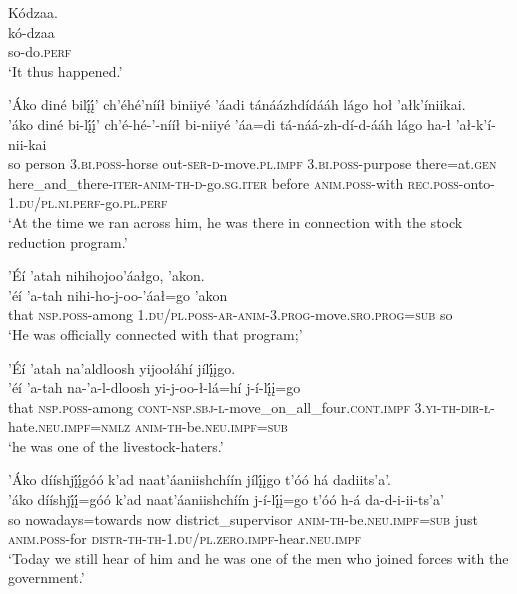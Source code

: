 \ea\label{ex:text7-10-5}
Kódzaa.\\
\gll kó-dzaa\\
     so-do.\textsc{perf}\\
\glt `It thus happened.'
\z

\ea\label{ex:text7-10-6}
’Áko diné bilį́į́’ ch’éhé’nííł biniiyé ’áadi tánáázhdídááh lágo hoł ’ałk’íniikai.\\
\gll ’áko	diné	bi-lį́į́’	ch’é-hé-’-nííł	bi-niiyé	’áa=di	tá-náá-zh-dí-d-ááh	lágo	ha-ł	’ał-k’í-nii-kai\\
     so	person	3.\textsc{bi}.\textsc{poss}-horse	out-\textsc{ser}-\textsc{d}-move.\textsc{pl}.\textsc{impf}	3.\textsc{bi}.\textsc{poss}-purpose	there=at.\textsc{gen}	here\_and\_there-\textsc{iter}-\textsc{anim}-\textsc{th}-\textsc{d}-go.\textsc{sg}.\textsc{iter}	before	\textsc{anim}.\textsc{poss}-with	\textsc{rec}.\textsc{poss}-onto-1.\textsc{du}/\textsc{pl}.\textsc{ni}.\textsc{perf}-go.\textsc{pl}.\textsc{perf}\\
\glt `At the time we ran across him, he was there in connection with the stock reduction program.'
\z

\ea\label{ex:text7-10-7}
’Éí ’atah nihihojoo’áałgo, ’akon.\\
\gll ’éí	’a-tah	nihi-ho-j-oo-’áał=go	’akon\\
     that	\textsc{nsp}.\textsc{poss}-among	1.\textsc{du}/\textsc{pl}.\textsc{poss}-\textsc{ar}-\textsc{anim}-3.\textsc{prog}-move.\textsc{sro}.\textsc{prog}=\textsc{sub}	so\\
\glt `He was officially connected with that program;'
\z

\ea\label{ex:text7-10-8}
’Éí ’atah na’aldloosh yijoołáhí jílį́įgo.\\
\gll ’éí	’a-tah	na-’a-l-dloosh	yi-j-oo-ł-lá=hí	j-í-lį́į=go\\
     that	\textsc{nsp}.\textsc{poss}-among	\textsc{cont}-\textsc{nsp}.\textsc{sbj}-\textsc{l}-move\_on\_all\_four.\textsc{cont}.\textsc{impf}	3.\textsc{yi}-\textsc{th}-\textsc{dir}-\textsc{ł}-hate.\textsc{neu}.\textsc{impf}=\textsc{nmlz}	\textsc{anim}-\textsc{th}-be.\textsc{neu}.\textsc{impf}=\textsc{sub}\\
\glt `he was one of the livestock-haters.'
\z

\ea\label{ex:text7-10-9}
’Áko dííshjį́į́góó k’ad naat’áaniishchíín jílį́įgo t’óó há dadiits’a’.\\
\gll ’áko	dííshjį́į́=góó	k’ad	naat’áaniishchíín	j-í-lį́į=go	t’óó	h-á	da-d-i-ii-ts’a’\\
     so	nowadays=towards	now	district\_supervisor	\textsc{anim}-\textsc{th}-be.\textsc{neu}.\textsc{impf}=\textsc{sub}	just	\textsc{anim}.\textsc{poss}-for	\textsc{distr}-\textsc{th}-\textsc{th}-1.\textsc{du}/\textsc{pl}.\textsc{zero}.\textsc{impf}-hear.\textsc{neu}.\textsc{impf}\\
\glt `Today we still hear of him and he was one of the men who joined forces with the government.'
\z

